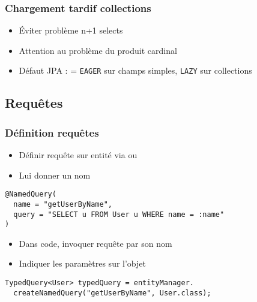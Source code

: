 \documentclass[english, french]{beamer}
\begin{document}
\begin{frame}
	\frametitle{Chargement tardif collections}
	\begin{itemize}
		\item Éviter problème n+1 selects %
		\item Attention au problème du produit cardinal
		\item Défaut JPA :  = \texttt{EAGER} sur champs simples, \texttt{LAZY} sur collections
	\end{itemize}
\end{frame}

\subsection{Requêtes}
\begin{frame}[fragile]
	\frametitle{Définition requêtes}
	\begin{itemize}
		\item Définir requête sur entité via  {\tiny ou  }
		\item Lui donner un nom
	\end{itemize}
	\begin{lstlisting}
@NamedQuery(
  name = "getUserByName",
  query = "SELECT u FROM User u WHERE name = :name"
)
	\end{lstlisting}
	\begin{itemize}
		\item Dans code, invoquer requête par son nom
		\item Indiquer les paramètres sur l’objet 
	\end{itemize}
	\begin{lstlisting}
TypedQuery<User> typedQuery = entityManager.
  createNamedQuery("getUserByName", User.class);
	\end{lstlisting}
\end{frame}
\end{document}
